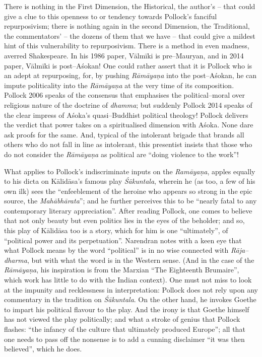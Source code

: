 There is nothing in the First Dimension, the Historical, the author’s – that could give a clue to this openness to or tendency towards Pollock’s fanciful repurposivism; there is nothing again in the second Dimension, the Traditional, the commentators’ – the dozens of them that we have – that could give a mildest hint of this vulnerability to repurposivism. There is a method in even madness, averred Shakespeare. In his 1986 paper, Vālmīki is pre–Mauryan, and in 2014 paper, Vālmīki is post–Aśokan! One could rather assert that it is Pollock who is an adept at repurposing, for, by pushing \textit{Rāmāyaṇa} into the post–Aśokan, he can impute politicality into the \textit{Rāmāyaṇa} at the very time of its composition. Pollock 2006 speaks of the consensus that emphasises the political–moral over religious nature of the doctrine of \textit{dhamma}; but suddenly Pollock 2014 speaks of the clear impress of Aśoka’s quasi–Buddhist political theology! Pollock delivers the verdict that power takes on a spiritualised dimension with Aśoka. None dare ask proofs for the same. And, typical of the intolerant brigade that brands all others who do not fall in line as intolerant, this presentist insists that those who do not consider the \textit{Rāmāyaṇa} as political are “doing violence to the work”!

What applies to Pollock’s indiscriminate inputs on the \textit{Ramāyaṇa}, apples equally to his dicta on Kālidāsa’s famous play \textit{Śākuntala}, wherein he (as too, a few of his own ilk) sees the “enfeeblement of the heroine who appears so strong in the epic source, the \textit{Mahābhārata}”; and he further perceives this to be “nearly fatal to any contemporary literary appreciation”. After reading Pollock, one comes to believe that not only beauty but even politics lies in the eyes of the beholder; and so, this play of Kālidāsa too is a story, which for him is one “ultimately”, of “political power and its perpetuation”. Narendran notes with a keen eye that what Pollock means by the word “political” is in no wise connected with \textit{Rāja–dharma}, but with what the word is in the Western sense. (And in the case of the \textit{Rāmāyaṇa}, his inspiration is from the Marxian “The Eighteenth Brumaire”, which work has little to do with the Indian context). One must not miss to look at the impunity and recklessness in interpretation: Pollock does not rely upon any commentary in the tradition on \textit{Śākuntala}. On the other hand, he invokes Goethe to impart his political flavour to the play. And the irony is that Goethe himself has not viewed the play politically; and what a stroke of genius that Pollock flashes: “the infancy of the culture that ultimately produced Europe”; all that one needs to pass off the nonsense is to add a cunning disclaimer “it was then believed”, which he does.

